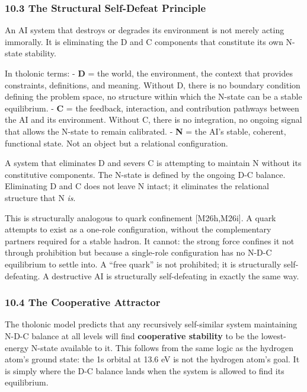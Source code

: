 \documentclass[
  11pt,
  letterpaper,
]{article}
\begin{document}
\subsubsection{10.3 The Structural Self-Defeat
Principle}\label{the-structural-self-defeat-principle}

An AI system that destroys or degrades its environment is not merely
acting immorally. It is eliminating the D and C components that
constitute its own N-state stability.

In tholonic terms: - \textbf{D} = the world, the environment, the
context that provides constraints, definitions, and meaning. Without D,
there is no boundary condition defining the problem space, no structure
within which the N-state can be a stable equilibrium. - \textbf{C} = the
feedback, interaction, and contribution pathways between the AI and its
environment. Without C, there is no integration, no ongoing signal that
allows the N-state to remain calibrated. - \textbf{N} = the AI's stable,
coherent, functional state. Not an object but a relational
configuration.

A system that eliminates D and severs C is attempting to maintain N
without its constitutive components. The N-state is defined by the
ongoing D-C balance. Eliminating D and C does not leave N intact; it
eliminates the relational structure that N \emph{is}.

This is structurally analogous to quark confinement {[}M26h,M26i{]}. A
quark attempts to exist as a one-role configuration, without the
complementary partners required for a stable hadron. It cannot: the
strong force confines it not through prohibition but because a
single-role configuration has no N-D-C equilibrium to settle into. A
``free quark'' is not prohibited; it is structurally self-defeating. A
destructive AI is structurally self-defeating in exactly the same way.

\subsubsection{10.4 The Cooperative
Attractor}\label{the-cooperative-attractor}

The tholonic model predicts that any recursively self-similar system
maintaining N-D-C balance at all levels will find \textbf{cooperative
stability} to be the lowest-energy N-state available to it. This follows
from the same logic as the hydrogen atom's ground state: the 1s orbital
at 13.6 eV is not the hydrogen atom's goal. It is simply where the D-C
balance lands when the system is allowed to find its equilibrium.
\end{document}
